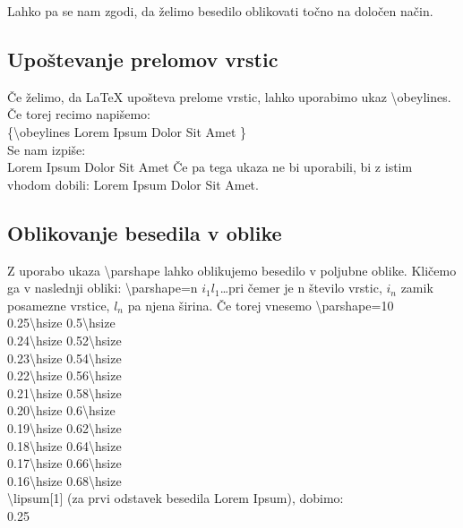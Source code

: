 \documentclass[a4paper]{book}
\newcommand\tbs{\textbackslash{}}
\begin{document}
Lahko pa se nam zgodi, da želimo besedilo oblikovati točno na določen način. 

\subsection{Upoštevanje prelomov vrstic}

Če želimo, da \LaTeX{} upošteva prelome vrstic, lahko uporabimo ukaz \tbs{}obeylines.
Če torej recimo napišemo:
\\
{\obeylines\parindent=0pt
\{\tbs{}obeylines
Lorem Ipsum
Dolor Sit
Amet
\}\\
}
\noindent{} Se nam izpiše:
\\
{\obeylines\parindent=0pt
Lorem Ipsum
Dolor Sit
Amet
} Če pa tega ukaza ne bi uporabili, bi z istim vhodom dobili:
Lorem Ipsum
Dolor Sit
Amet.

\subsection{Oblikovanje besedila v oblike}

Z uporabo ukaza \tbs{}parshape lahko oblikujemo besedilo v poljubne oblike. Kličemo ga v naslednji obliki: \tbs{}parshape=n $i_1 l_1$\ldots pri čemer je n število vrstic, $i_n$ zamik posamezne vrstice, $l_n$ pa njena širina.
Če torej vnesemo 
\tbs{}parshape=10 \\ 
0.25\tbs{}hsize 0.5\tbs{}hsize \\ 
0.24\tbs{}hsize 0.52\tbs{}hsize \\ 
0.23\tbs{}hsize 0.54\tbs{}hsize \\ 
0.22\tbs{}hsize 0.56\tbs{}hsize \\ 
0.21\tbs{}hsize 0.58\tbs{}hsize \\ 
0.20\tbs{}hsize 0.6\tbs{}hsize \\ 
0.19\tbs{}hsize 0.62\tbs{}hsize \\ 
0.18\tbs{}hsize 0.64\tbs{}hsize \\ 
0.17\tbs{}hsize 0.66\tbs{}hsize \\ 
0.16\tbs{}hsize 0.68\tbs{}hsize \\ 
\tbs{}lipsum[1] (za prvi odstavek besedila Lorem Ipsum), dobimo:\\

0.25\hsize
\noindent\lipsum[1]
\end{document}
